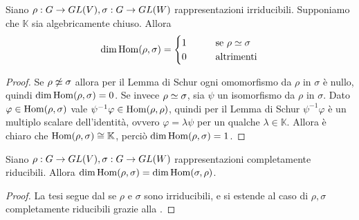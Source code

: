 \begin{corollary}
Siano $\rho:G\to GL(V),\allowbreak\sigma:G\to GL(W)$ rappresentazioni irriducibili. Supponiamo che $\mathbb{K}$ sia algebricamente chiuso. Allora
$$
\dim\operatorname{Hom}(\rho,\sigma)=
\begin{cases}
1\qquad&\text{se $\rho\simeq\sigma$}\\
0\qquad&\text{altrimenti}
\end{cases}
$$
\end{corollary}
\begin{proof}
Se $\rho\not\simeq\sigma$ allora per il Lemma di Schur ogni omomorfismo da $\rho$ in $\sigma$ è nullo, quindi $\dim\operatorname{Hom}(\rho,\sigma)=0$. Se invece $\rho\simeq\sigma$, sia $\psi$ un isomorfismo da $\rho$ in $\sigma$. Dato $\varphi\in\operatorname{Hom}(\rho,\sigma)$ vale $\psi^{-1}\varphi\in\operatorname{Hom}(\rho,\rho)$, quindi per il Lemma di Schur $\psi^{-1}\varphi$ è un multiplo scalare dell'identità, ovvero $\varphi=\lambda\psi$ per un qualche $\lambda\in\mathbb{K}$. Allora è chiaro che $\operatorname{Hom}(\rho,\sigma)\cong\mathbb{K}$, perciò $\dim\operatorname{Hom}(\rho,\sigma)=1$.
\end{proof}

\begin{corollary}
Siano $\rho:G\to GL(V),\allowbreak\sigma:G\to GL(W)$ rappresentazioni completamente riducibili. Allora $\dim\operatorname{Hom}(\rho,\sigma)=\dim\operatorname{Hom}(\sigma,\rho)$.
\end{corollary}
\begin{proof}
La tesi segue dal  se $\rho$ e $\sigma$ sono irriducibili, e si estende al caso di $\rho\comma\sigma$ completamente riducibili grazie alla .
\end{proof}

